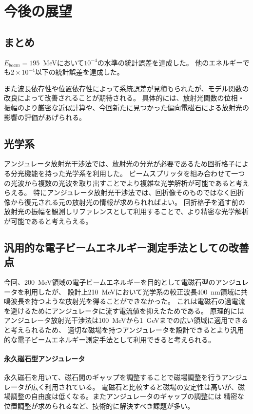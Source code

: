 \documentclass[a4paper,11pt,uplatex]{jsbook}
\begin{document}
\chapter{今後の展望}
\section{まとめ}
$E_{beam}=195$~MeVにおいて$10^{-4}$の水準の統計誤差を達成した。
他のエネルギーでも$2\times10^{-4}$以下の統計誤差を達成した。

また波長依存性や位置依存性によって系統誤差が見積もられたが、モデル関数の改良によって改善されることが期待される。
具体的には、放射光関数の位相・振幅のより厳密な近似計算や、今回新たに見つかった偏向電磁石による放射光の影響の評価があげられる。
\section{光学系}
アンジュレータ放射光干渉法では、放射光の分光が必要であるため回折格子による分光機能を持った光学系を利用した。
ビームスプリッタを組み合わせて一つの光波から複数の光波を取り出すことでより複雑な光学解析が可能であると考えらえる。
特にアンジュレータ放射光干渉法では、回折像そのものではなく回折像から復元される元の放射光の情報が求められればよい。
回折格子を通す前の放射光の振幅を観測しリファレンスとして利用することで、より精密な光学解析が可能であると考えらえる。

\section{汎用的な電子ビームエネルギー測定手法としての改善点}
今回、200~MeV領域の電子ビームエネルギーを目的として電磁石型のアンジュレータを利用したが、
設計上210~MeVにおいて光学系の較正波長400~nm領域に共鳴波長を持つような放射光を得ることができなかった。
これは電磁石の過電流を避けるためにアンジュレータに流す電流値を抑えたためである。
原理的にはアンジュレータ放射光干渉法は100~MeVから1~GeVまでの広い領域に適用できると考えられるため、
適切な磁場を持つアンジュレータを設計できるとより汎用的な電子ビームエネルギー測定手法として利用できると考えられる。
\subsubsection{永久磁石型アンジュレータ}
永久磁石を用いて、磁石間のギャップを調整することで磁場調整を行うアンジュレータが広く利用されている。
電磁石と比較すると磁場の安定性は高いが、磁場調整の自由度は低くなる。またアンジュレータのギャップの調整には
精密な位置調整が求められるなど、技術的に解決すべき課題が多い。
\end{document}
